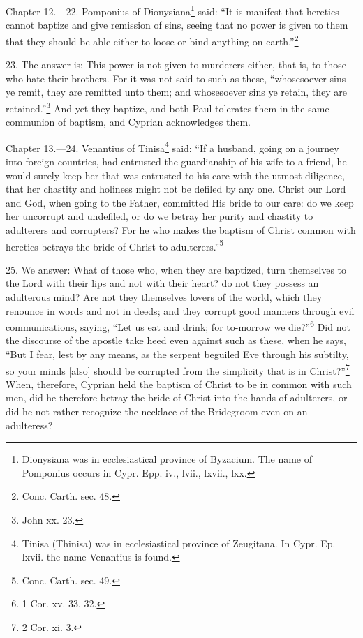 
Chapter 12.—22. Pomponius of Dionysiana\footnote{\par  Dionysiana was in ecclesiastical province of Byzacium. The name of Pomponius occurs in Cypr. Epp. iv., lvii., lxvii., lxx.} said: ``It is manifest that heretics cannot baptize and give remission of sins, seeing that no power is given to them that they should be able either to loose or bind anything on earth.''\footnote{\par  Conc. Carth. sec. 48.}

23. The answer is: This power is not given to murderers either, that is, to those who hate their brothers. For it was not said to such as these, ``whosesoever sins ye remit, they are remitted unto them; and whosesoever sins ye retain, they are retained.''\footnote{\par  John xx. 23.} And yet they baptize, and both Paul tolerates them in the same communion of baptism, and Cyprian acknowledges them.


Chapter 13.—24. Venantius of Tinisa\footnote{\par  Tinisa (Thinisa) was in ecclesiastical province of Zeugitana. In Cypr. Ep. lxvii. the name Venantius is found.} said: ``If a husband, going on a journey into foreign countries, had entrusted the guardianship of his wife to a friend, he would surely keep her that was entrusted to his care with the utmost diligence, that her chastity and holiness might not be defiled by any one. Christ our Lord and God, when going to the Father, committed His bride to our care: do we keep her uncorrupt and undefiled, or do we betray her purity and chastity to adulterers and corrupters? For he who makes the baptism of Christ common with heretics betrays the bride of Christ to adulterers.''\footnote{\par  Conc. Carth. sec. 49.}

25. We answer: What of those who, when they are baptized, turn themselves to the Lord with their lips and not with their heart? do not they possess an adulterous mind? Are not they themselves lovers of the world, which they renounce in words and not in deeds; and they corrupt good manners through evil communications, saying, ``Let us eat and drink; for to-morrow we die?''\footnote{\par  1 Cor. xv. 33, 32.} Did not the discourse of the apostle take heed even against such as these, when he says, ``But I fear, lest by any means, as the serpent beguiled Eve through his subtilty, so your minds [also] should be corrupted from the simplicity that is in Christ?''\footnote{\par  2 Cor. xi. 3.} When, therefore, Cyprian held the baptism of Christ to be in common with such men, did he therefore betray the bride of Christ into the hands of adulterers, or did he not rather recognize the necklace of the Bridegroom even on an adulteress?

